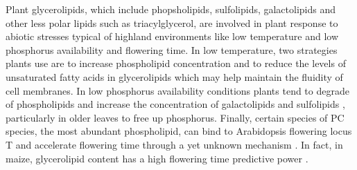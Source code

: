 \documentclass[9pt,twocolumn,twoside,lineno]{BioRxiv}
\begin{document}
Plant glycerolipids, which include phopsholipids, sulfolipids, galactolipids and other less polar lipids such as triacylglycerol, are involved in plant response to abiotic stresses typical of highland environments like low temperature and low phosphorus availability and flowering time.
In low temperature, two strategies plants use are to increase phospholipid concentration \cite{Degenkolbe2012-wf} and to reduce the levels of unsaturated fatty acids in glycerolipids \cite{Welti2002-uk, Lynch1987-ln} which may help maintain the fluidity of cell membranes.
In low phosphorus availability conditions plants tend to  degrade of phospholipids and increase the concentration of galactolipids and sulfolipids \cite{Lambers2012-an}, particularly in older leaves to free up phosphorus. 
Finally, certain species of PC species, the most abundant phospholipid, can bind to Arabidopsis flowering locus T and accelerate flowering time through a yet unknown mechanism \cite{Nakamura2014-qf}. 
In fact, in maize, glycerolipid content has a high flowering time predictive power \cite{Riedelsheimer2013-bd}. 
\end{document}

